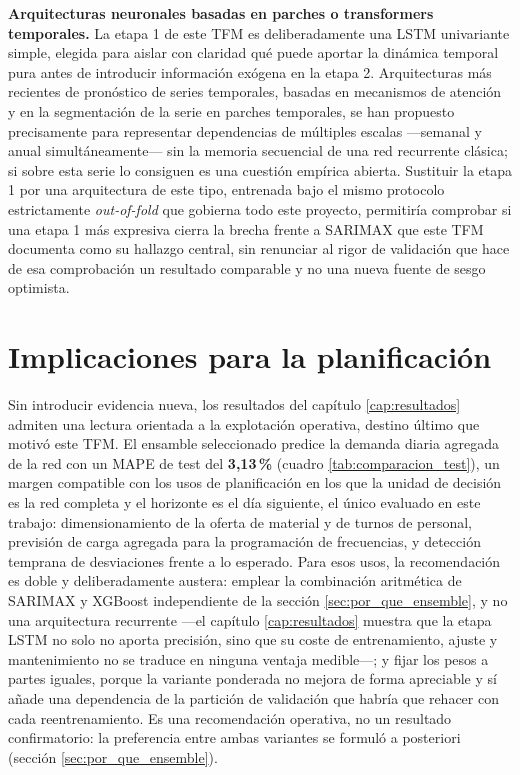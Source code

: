 \textbf{Arquitecturas neuronales basadas en parches o transformers temporales.} La etapa
1 de este TFM es deliberadamente una LSTM univariante simple, elegida para aislar con
claridad qué puede aportar la dinámica temporal pura antes de introducir información
exógena en la etapa 2. Arquitecturas más recientes de pronóstico de series temporales,
basadas en mecanismos de atención y en la segmentación de la serie en parches temporales,
se han propuesto precisamente para representar dependencias de múltiples escalas —semanal
y anual simultáneamente— sin la memoria secuencial de una red recurrente clásica; si
sobre esta serie lo consiguen es una cuestión empírica abierta. Sustituir la etapa 1 por
una arquitectura de este tipo, entrenada bajo el mismo protocolo estrictamente
\emph{out-of-fold} que gobierna todo este proyecto, permitiría comprobar si una etapa 1
más expresiva cierra la brecha frente a SARIMAX que este TFM documenta como su hallazgo
central, sin renunciar al rigor de validación que hace de esa comprobación un resultado
comparable y no una nueva fuente de sesgo optimista.

\section{Implicaciones para la planificación}\label{sec:implicaciones_planificacion}

Sin introducir evidencia nueva, los resultados del capítulo \ref{cap:resultados} admiten
una lectura orientada a la explotación operativa, destino último que motivó este TFM. El
ensamble seleccionado predice la demanda diaria agregada de la red con un MAPE de test del
\textbf{3,13\,\%} (cuadro \ref{tab:comparacion_test}), un margen compatible con los usos
de planificación en los que la unidad de decisión es la red completa y el horizonte es el
día siguiente, el único evaluado en este trabajo: dimensionamiento de la oferta de
material y de turnos de personal, previsión de carga agregada para la programación de
frecuencias, y detección temprana de desviaciones frente a lo esperado. Para esos usos,
la recomendación es doble y deliberadamente austera: emplear la combinación aritmética de
SARIMAX y XGBoost independiente de la sección \ref{sec:por_que_ensemble}, y no una
arquitectura recurrente ---el capítulo \ref{cap:resultados} muestra que la etapa LSTM no
solo no aporta precisión, sino que su coste de entrenamiento, ajuste y mantenimiento no se
traduce en ninguna ventaja medible---; y fijar los pesos a partes iguales, porque la
variante ponderada no mejora de forma apreciable y sí añade una dependencia de la
partición de validación que habría que rehacer con cada reentrenamiento. Es una
recomendación operativa, no un resultado confirmatorio: la preferencia entre ambas
variantes se formuló a posteriori (sección \ref{sec:por_que_ensemble}).

